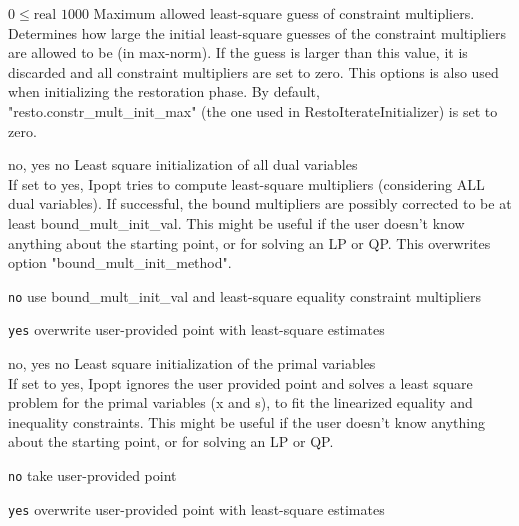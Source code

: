 %
{$0\leq\textrm{real}$}%
{$1000$}%
{Maximum allowed least-square guess of constraint multipliers.\\
Determines how large the initial least-square guesses of the constraint multipliers are allowed to be (in max-norm). If the guess is larger than this value, it is discarded and all constraint multipliers are set to zero.  This options is also used when initializing the restoration phase. By default, "resto.constr\_mult\_init\_max" (the one used in RestoIterateInitializer) is set to zero.}%
{}

%
{\ttfamily no, yes}%
{no}%
{Least square initialization of all dual variables\\
If set to yes, Ipopt tries to compute least-square multipliers (considering ALL dual variables).  If successful, the bound multipliers are possibly corrected to be at least bound\_mult\_init\_val. This might be useful if the user doesn't know anything about the starting point, or for solving an LP or QP.  This overwrites option "bound\_mult\_init\_method".}%
{\begin{list}{}{
\setlength{\parsep}{0em}
\setlength{\leftmargin}{5ex}
\setlength{\labelwidth}{2ex}
\setlength{\itemindent}{0ex}
\setlength{\topsep}{0pt}}
\item[\texttt{no}] use bound\_mult\_init\_val and least-square equality constraint multipliers
\item[\texttt{yes}] overwrite user-provided point with least-square estimates
\end{list}
}

%
{\ttfamily no, yes}%
{no}%
{Least square initialization of the primal variables\\
If set to yes, Ipopt ignores the user provided point and solves a least square problem for the primal variables (x and s), to fit the linearized equality and inequality constraints.  This might be useful if the user doesn't know anything about the starting point, or for solving an LP or QP.}%
{\begin{list}{}{
\setlength{\parsep}{0em}
\setlength{\leftmargin}{5ex}
\setlength{\labelwidth}{2ex}
\setlength{\itemindent}{0ex}
\setlength{\topsep}{0pt}}
\item[\texttt{no}] take user-provided point
\item[\texttt{yes}] overwrite user-provided point with least-square estimates
\end{list}
}

